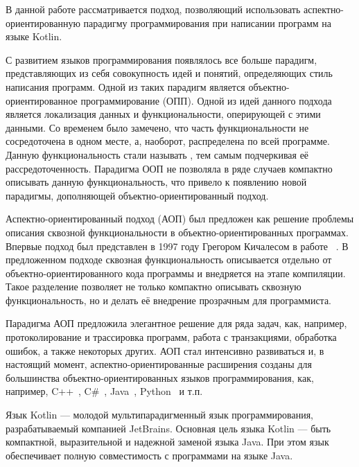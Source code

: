 \intro

В данной работе рассматривается подход, позволяющий использовать аспектно-ориентированную парадигму программирования при написании программ на языке Kotlin.

С развитием языков программирования появлялось все больше парадигм, представляющих из себя совокупность идей и понятий, определяющих стиль написания программ.
Одной из таких парадигм является объектно-ориентированное программирование (ОПП).
Одной из идей данного подхода является локализация данных и функциональности, оперирующей с этими данными.
Со временем было замечено, что часть функциональности не сосредоточена в одном месте, а, наоборот, распределена по всей программе.
Данную функциональность стали называть , тем самым подчеркивая её рассредоточенность.
Парадигма ООП не позволяла в ряде случаев компактно описывать данную функциональность, что привело к появлению новой парадигмы, дополняющей объектно-ориентированный подход.

Аспектно-ориентированный подход (АОП) был предложен как решение проблемы
описания сквозной функциональности в объектно-ориентированных программах.
Впервые подход был представлен в 1997 году Грегором Кичалесом в работе
~\cite{kiczales_aop}.
В предложенном подходе сквозная функциональность описывается отдельно от
объектно-ориентированного кода программы и внедряется на этапе компиляции.
Такое разделение позволяет не только компактно описывать сквозную 
функциональность, но и делать её внедрение прозрачным для программиста.

Парадигма АОП предложила элегантное решение для ряда задач, как, например, 
протоколирование и трассировка программ, работа с транзакциями, обработка
ошибок, а также некоторых других.
АОП стал интенсивно развиваться и, в настоящий момент, аспектно-ориентированные
расширения созданы для большинства объектно-ориентированных языков
программирования, как, например, C++~\cite{aspectC_homepage},
C\#~\cite{postsharp_doc}, Java~\cite{aspectj_doc,springAOP_doc},
Python~\cite{spring_python} и т.п.

Язык Kotlin --- молодой мультипарадигменный язык программирования,
разрабатываемый компанией JetBrains.
Основная цель языка Kotlin --- быть компактной, выразительной и надежной заменой
языка Java.
При этом язык обеспечивает полную совместимость с программами на языке
Java.

